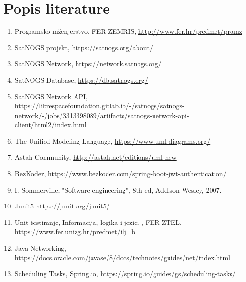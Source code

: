 \chapter*{Popis literature}
		
		
		\begin{enumerate}
			
			
			\item  Programsko inženjerstvo, FER ZEMRIS, 
			 	\url{http://www.fer.hr/predmet/proinz}
			\item SatNOGS projekt, 
				\url {https://satnogs.org/about/}
			\item SatNOGS Network,  
				\url {https://network.satnogs.org/}
			\item SatNOGS Database, 
				 \url {https://db.satnogs.org/}
			\item SatNOGS Network API,
				\url {https://librespacefoundation.gitlab.io/-/satnogs/satnogs-network/-/jobs/3313398089/artifacts/satnogs-network-api-client/html2/index.html}
			
			\item  The Unified Modeling Language, \url{https://www.uml-diagrams.org/}
			
			\item  Astah Community, 
				\url{http://astah.net/editions/uml-new}
			\item BezKoder,
				\url {https://www.bezkoder.com/spring-boot-jwt-authentication/}
			\item  I. Sommerville, "Software engineering", 8th ed, Addison Wesley, 2007.
			\item Junit5 
				\url{https://junit.org/junit5/}
			\item Unit testiranje, Informacija, logika i jezici , FER ZTEL,
				\url{https://www.fer.unizg.hr/predmet/ilj_b}
			\item Java Networking,
				\url{https://docs.oracle.com/javase/8/docs/technotes/guides/net/index.html}
			\item Scheduling Tasks, Spring.io,
				\url{https://spring.io/guides/gs/scheduling-tasks/}
		\end{enumerate}
		
		 